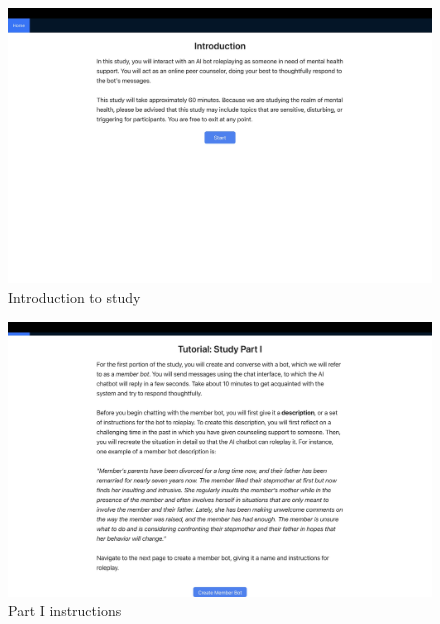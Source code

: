 \documentclass[11pt]{article}
\begin{document}
\begin{figure}[ht]
    \centering
    \includegraphics[width=\textwidth]{Study_Screenshots/Screen1.jpeg}
    \caption{Introduction to study}
    \label{fig:screen1}
\end{figure}

\begin{figure}[ht]
    \centering
    \includegraphics[width=\textwidth]{Study_Screenshots/Screen2.jpeg}
    \caption{Part I instructions}
    \label{fig:screen2}
\end{figure}
\end{document}
